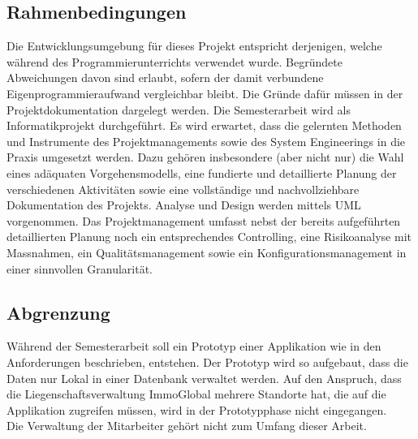 \subsection{Rahmenbedingungen}
Die Entwicklungsumgebung für dieses Projekt entspricht derjenigen, welche während des Programmierunterrichts verwendet wurde. Begründete Abweichungen davon sind erlaubt, sofern der damit verbundene Eigenprogrammieraufwand vergleichbar bleibt. Die Gründe dafür müssen in der Projektdokumentation dargelegt werden.
Die Semesterarbeit wird als Informatikprojekt durchgeführt. Es wird erwartet, dass die gelernten Methoden und Instrumente des Projektmanagements sowie des System Engineerings in die Praxis umgesetzt werden. Dazu gehören insbesondere (aber nicht nur) die Wahl eines adäquaten Vorgehensmodells, eine fundierte und detaillierte Planung der verschiedenen Aktivitäten sowie eine vollständige und nachvollziehbare Dokumentation des Projekts. Analyse und Design werden mittels UML vorgenommen.
Das Projektmanagement umfasst nebst der bereits aufgeführten detaillierten Planung noch ein entsprechendes Controlling, eine Risikoanalyse mit Massnahmen, ein Qualitätsmanagement sowie ein Konfigurationsmanagement in einer sinnvollen Granularität.

\subsection{Abgrenzung}
Während der Semesterarbeit soll ein Prototyp einer Applikation wie in den Anforderungen beschrieben, entstehen. Der Prototyp wird so aufgebaut, dass die Daten nur Lokal in einer Datenbank verwaltet werden. Auf den Anspruch, dass die Liegenschaftsverwaltung ImmoGlobal mehrere Standorte hat, die auf die Applikation zugreifen müssen, wird in der Prototypphase nicht eingegangen.\\
Die Verwaltung der Mitarbeiter gehört nicht zum Umfang dieser Arbeit.


